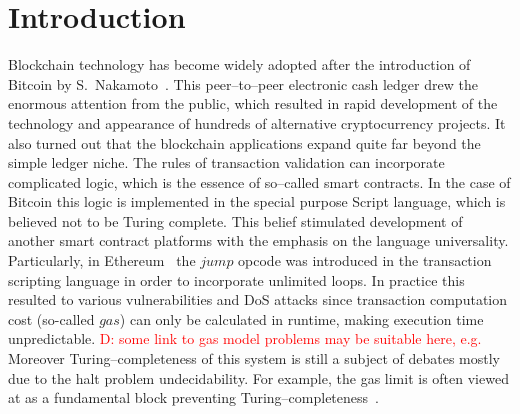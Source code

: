 \documentclass[runningheads]{llncs}
\newcommand{\dnote}[1]{\textcolor{red}{D: {#1}}}
\begin{document}
    \section{Introduction}
    Blockchain technology has become widely adopted after the introduction of
    Bitcoin by S.~Nakamoto~\cite{nakamoto2008bitcoin}. This peer--to--peer
    electronic cash ledger drew the enormous attention from the public, which
    resulted in rapid development of the technology and appearance of hundreds
    of alternative cryptocurrency projects. It also turned out that the
    blockchain applications expand quite far beyond the simple ledger niche. The
    rules of transaction validation can incorporate complicated logic, which is
    the essence of so--called smart contracts. In the case of Bitcoin this logic
    is implemented in the special purpose Script language, which is believed not
    to be Turing complete. This belief stimulated development of another smart
    contract platforms with the emphasis on the language universality.
    Particularly, in Ethereum~\cite{buterin2014next} the $jump$ opcode was
    introduced in the transaction scripting language in order to incorporate
    unlimited loops.
    In practice this resulted to various vulnerabilities and DoS attacks \cite{atzei2017survey}
    since transaction computation cost (so-called $gas$) can only be calculated in runtime,
    making execution time unpredictable. \dnote{some link to gas model problems may
    be suitable here, e.g. \cite{Earlz2017}}
    Moreover Turing--completeness of this system is still a
    subject of debates mostly due to the halt problem undecidability.  For
    example, the gas limit is often viewed at as a fundamental block preventing
    Turing--completeness~\cite{miller2016ethereum}.
\end{document}
